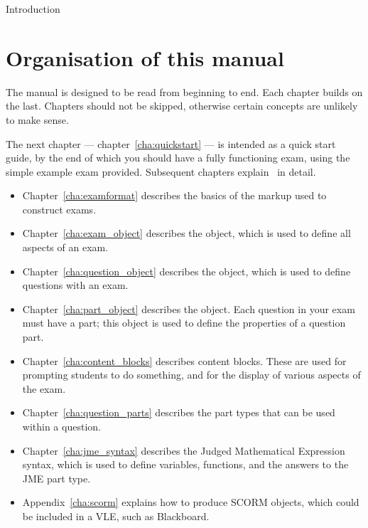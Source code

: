 \begin{chapter}{\label{cha:introduction}Introduction}
  \section{Organisation of this manual}
  The manual is designed to be read from beginning to end.  Each chapter builds
  on the last.  Chapters should not be skipped, otherwise certain concepts are
  unlikely to make sense.

  The next chapter --- chapter~\ref{cha:quickstart} --- is intended as a quick
  start guide, by the end of which you should have a fully functioning exam,
  using the simple example exam provided.  Subsequent chapters explain \numbas\
  in detail.
  \begin{itemize}
    \item Chapter~\ref{cha:examformat} describes the basics of the markup used
      to construct exams.
    \item Chapter~\ref{cha:exam_object} describes the  object,
      which is used to define all aspects of an exam.
    \item Chapter~\ref{cha:question_object} describes the 
      object, which is used to define questions with an exam.
    \item Chapter~\ref{cha:part_object} describes the  object.
      Each question in your exam must have a part; this object is used to
      define the properties of a question part.
    \item Chapter~\ref{cha:content_blocks} describes content blocks.  These are
      used for prompting students to do something, and for the display of
      various aspects of the exam.
    \item Chapter~\ref{cha:question_parts} describes the part types that can
      be used within a question.
    \item Chapter~\ref{cha:jme_syntax} describes the Judged Mathematical
      Expression syntax, which is used to define variables, functions, and the
      answers to the JME part type.
    \item Appendix~\ref{cha:scorm} explains how to produce SCORM objects, which
      could be included in a VLE, such as Blackboard.
  \end{itemize}
\end{chapter}
